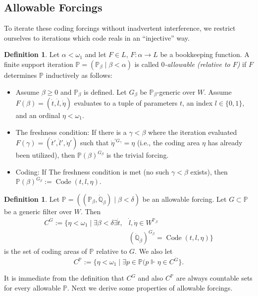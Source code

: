 \documentclass{article}
\theoremstyle{plain}
\theoremstyle{definition}
\newtheorem{definition}[theorem]{Definition}
\newcommand{\forceP}{\mathbb{P}}
\newcommand{\forceQ}{\mathbb{Q}}
\newcommand{\code}{\operatorname{Code}}
\begin{document}
\subsection{Allowable Forcings}
To iterate these coding forcings without inadvertent interference, we restrict ourselves to iterations which code reals in an ``injective'' way.

\begin{definition} \label{Def:Allowable}
Let $\alpha < \omega_1$ and let $F \in L$, $F: \alpha \to L$ be a bookkeeping function. A finite support iteration $\mathbb{P} = (\mathbb{P}_\beta \mid \beta < \alpha)$ is called \emph{$0$-allowable (relative to $F$)} if $F$ determines $\mathbb{P}$ inductively as follows:
\begin{itemize}
    \item[] Assume $\beta \ge 0$ and $\mathbb{P}_\beta$ is defined. Let $G_\beta$ be $\mathbb{P}_\beta$-generic over $W$. Assume $F(\beta) = (\dot{t}, \dot{l}, \dot{\eta})$ evaluates to a tuple of parameters $t$, an index $l \in \{0,1\}$, and an ordinal $\eta < \omega_1$.
    \item The freshness condition: If there is a $\gamma < \beta$ where the iteration evaluated $F(\gamma) = (\dot{t}', \dot{l}', \dot{\eta}')$ such that $\dot{\eta}^{\prime G_\gamma} = \eta$ (i.e., the coding area $\eta$ has already been utilized), then $\mathbb{P}(\beta)^{G_\beta}$ is the trivial forcing.
    \item {Coding:} If The freshness condition is met (no such $\gamma < \beta$ exists), then $\mathbb{P}(\beta)^{G_\beta} := \code(t, l, \eta)$.
\end{itemize}
\end{definition}



\begin{definition}
Let $\forceP= ((\forceP_{\beta}, \dot{\forceQ}_{\beta}) \mid \beta < \delta)$ be an allowable forcing. Let $G \subset \forceP$ be a generic filter over $W$. Then
\begin{align*}
C^G:= \{ \eta < \omega_1\mid \exists \beta < \delta \exists \dot{t},&\dot{l}, \dot{\eta} \in W^{\forceP_{\beta}}  \\&( \dot{{\forceQ}}_{\beta})^{G_{\beta}} = \operatorname{Code} (t,l,\eta )\}
\end{align*}
is the set of coding areas of $\forceP$ relative to $G$. 
We also let 
\[ C^{\forceP} := \{\eta < \omega_1 \mid \exists p \in \forceP ( p \Vdash \eta  \in C^{\dot{G}} \}. \]
\end{definition}
It is immediate from the definition that $C^G$ and also $C^{\forceP}$ are always countable sets for every allowable $\forceP$. Next we derive some properties of allowable forcings.
\end{document}
